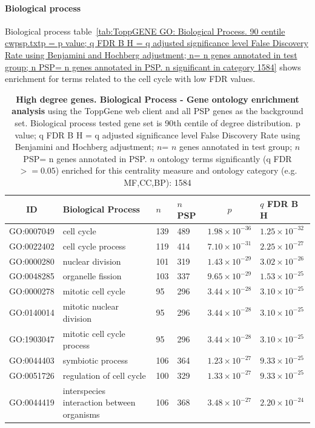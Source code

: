 \paragraph{Biological process}

Biological process table~\ref{tab:ToppGENE GO: Biological Process. 90 centile cwpsp.txtp = p value; q FDR B H = q adjusted significance level False Discovery Rate using Benjamini and Hochberg adjustment; n= n genes annotated in test group; n PSP= n genes annotated in PSP. n significant in category 1584} shows enrichment for terms related to the cell cycle with low FDR values. 
\begin{table}[ht]
\centering
\begin{adjustbox}{width=\textwidth}
\setlength{\extrarowheight}{2pt}
\begin{tabular}{@{}clllcl@{}}
  \toprule
  ID & Biological Process & $n$ & $n$ PSP & $p$ & $q$ FDR B H \\ 

  \midrule
GO:0007049 & cell cycle & 139 & 489 & $1.98 \times 10^{-36}$ & $1.25 \times 10^{-32}$ \\ 
  GO:0022402 & cell cycle process & 119 & 414 & $7.10 \times 10^{-31}$ & $2.25 \times 10^{-27}$ \\ 
  GO:0000280 & nuclear division & 101 & 319 & $1.43 \times 10^{-29}$ & $3.02 \times 10^{-26}$ \\ 
  GO:0048285 & organelle fission & 103 & 337 & $9.65 \times 10^{-29}$ & $1.53 \times 10^{-25}$ \\ 
  GO:0000278 & mitotic cell cycle & 95 & 296 & $3.44 \times 10^{-28}$ & $3.10 \times 10^{-25}$ \\ 
  GO:0140014 & mitotic nuclear division & 95 & 296 & $3.44 \times 10^{-28}$ & $3.10 \times 10^{-25}$ \\ 
  GO:1903047 & mitotic cell cycle process & 95 & 296 & $3.44 \times 10^{-28}$ & $3.10 \times 10^{-25}$ \\ 
  GO:0044403 & symbiotic process & 106 & 364 & $1.23 \times 10^{-27}$ & $9.33 \times 10^{-25}$ \\ 
  GO:0051726 & regulation of cell cycle & 100 & 329 & $1.33 \times 10^{-27}$ & $9.33 \times 10^{-25}$ \\ 
  GO:0044419 & interspecies interaction between organisms & 106 & 368 & $3.48 \times 10^{-27}$ & $2.20 \times 10^{-24}$ \\ 
   \bottomrule
\end{tabular}
\end{adjustbox}
\caption[Gene ontology enrichment Biological Process of genes above 90th centile of degree distribution]{\textbf{High degree genes. Biological Process - Gene ontology enrichment analysis} using the ToppGene web client and all PSP genes as the background set.  Biological process tested gene set is 90th centile of degree distribution.  p value; q FDR B H = q adjusted significance level False Discovery Rate using Benjamini and Hochberg adjustment; $n$= $n$ genes annotated in test group; $n$ PSP= n genes annotated in PSP. $n$ ontology terms significantly (q FDR$>=0.05$) enriched for this centrality measure and ontology category (e.g. MF,CC,BP): 1584} 


\end{table}
